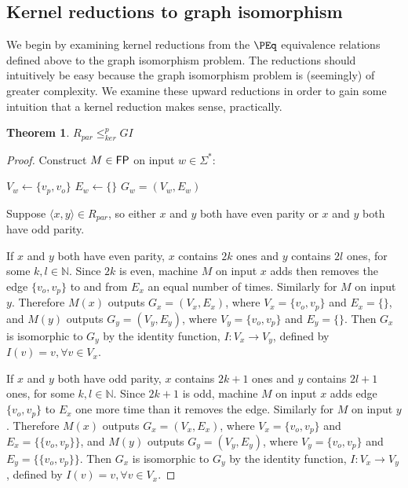 \documentclass{article}
\newtheorem{theorem}{Theorem}[section]
\theoremstyle{definition} \newtheorem{definition}[definition]{Definition}
\newcommand{\sigmastar}{\Sigma^{*}} %
\newcommand{\kr}{\leq^{p}_{ker}} %
\newcommand{\pair}[2]{\langle#1,#2\rangle} %
\begin{document}
\subsection{Kernel reductions to graph isomorphism}
We begin by examining kernel reductions from the $\PEq$ equivalence relations
defined above to the graph isomorphism problem. The reductions should
intuitively be easy because the graph isomorphism problem is (seemingly) of
greater complexity. We examine these upward reductions in order to gain some
intuition that a kernel reduction makes sense, practically.

\begin{theorem}\label{thm:rpar_gi}$R_{par}\kr GI$\end{theorem}
\begin{proof}
  Construct $M\in {\ensuremath{\mathsf{FP}}}$ on input $w\in\sigmastar$:\\
  \begin{algorithm}[H]
    $V_w\gets\{v_p, v_o\}$\;
    $E_w\gets\{\}$\;
    \Return $G_w=(V_w, E_w)$
  \end{algorithm}

  Suppose $\pair{x}{y}\in R_{par}$, so either $x$ and $y$ both have even parity
  or $x$ and $y$ both have odd parity.

  If $x$ and $y$ both have even parity, $x$ contains $2k$ ones and $y$ contains
  $2l$ ones, for some $k,l\in\mathbb{N}$. Since $2k$ is even, machine $M$ on
  input $x$ adds then removes the edge $\{v_o, v_p\}$ to and from $E_x$ an
  equal number of times. Similarly for $M$ on input $y$. Therefore $M(x)$
  outputs $G_x=(V_x, E_x)$, where $V_x=\{v_o, v_p\}$ and $E_x=\{\}$, and $M(y)$
  outputs $G_y=(V_y, E_y)$, where $V_y=\{v_o, v_p\}$ and $E_y=\{\}$. Then $G_x$
  is isomorphic to $G_y$ by the identity function, $I\colon V_x\to V_y$,
  defined by $I(v)=v, \forall v\in V_x$.

  If $x$ and $y$ both have odd parity, $x$ contains $2k+1$ ones and $y$
  contains $2l+1$ ones, for some $k,l\in\mathbb{N}$. Since $2k+1$ is odd,
  machine $M$ on input $x$ adds edge $\{v_o, v_p\}$ to $E_x$ one more time than
  it removes the edge. Similarly for $M$ on input $y$. Therefore $M(x)$ outputs
  $G_x=(V_x, E_x)$, where $V_x=\{v_o, v_p\}$ and $E_x=\{\{v_o, v_p\}\}$, and
  $M(y)$ outputs $G_y=(V_y, E_y)$, where $V_y=\{v_o, v_p\}$ and $E_y=\{\{v_o,
  v_p\}\}$. Then $G_x$ is isomorphic to $G_y$ by the identity function,
  $I\colon V_x\to V_y$, defined by $I(v)=v, \forall v\in V_x$.


\end{proof}
\end{document}
